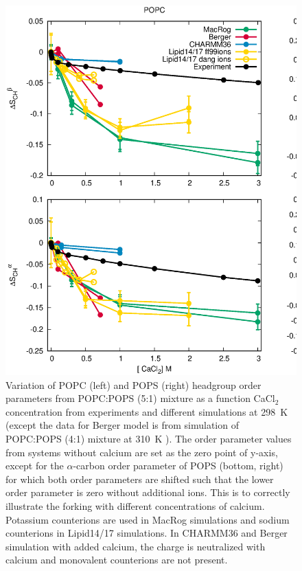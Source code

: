 \documentclass[journal=jpcbfk,manuscript=article]{achemso}
\begin{document}
\begin{figure}[tbp]
  \centering
  \includegraphics[width=18cm]{../Figs/CHANGESwithCaClPS.eps}
  \caption{\label{changesWITHCaClPS}
   Variation of POPC (left) and POPS (right) headgroup order parameters from POPC:POPS (5:1) mixture
    as a function CaCl$_2$ concentration from experiments \cite{roux90} and different simulations
    at 298~K (except the data for Berger model is from simulation of POPC:POPS (4:1) mixture at 310~K \cite{ollila07a,melcrova16}). 
    The order parameter values from systems without calcium are set as the zero point of y-axis,
    except for the $\alpha$-carbon order parameter of POPS (bottom, right) for which both order parameters are shifted
    such that the lower order parameter is zero without additional ions. This is to correctly illustrate
    the forking with different concentrations of calcium.
    Potassium counterions are used in MacRog simulations and sodium counterions in Lipid14/17 simulations.
    In CHARMM36 and Berger simulation with added calcium, the charge is neutralized with calcium and monovalent counterions are not present.
  }
\end{figure}
\end{document}
